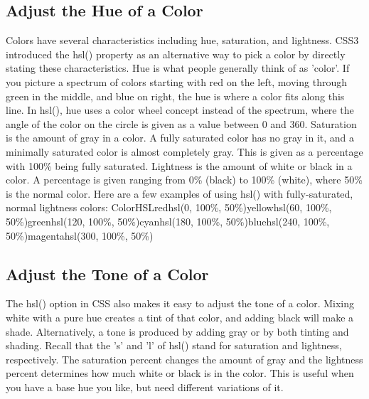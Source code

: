 \documentclass{article}%
\begin{document}
%
\subsection{Adjust the Hue of a Color}%
\label{subsec:AdjusttheHueofaColor}%
Colors have several characteristics including hue, saturation, and lightness. CSS3 introduced the hsl() property as an alternative way to pick a color by directly stating these characteristics.\newline%
Hue is what people generally think of as 'color'. If you picture a spectrum of colors starting with red on the left, moving through green in the middle, and blue on right, the hue is where a color fits along this line. In hsl(), hue uses a color wheel concept instead of the spectrum, where the angle of the color on the circle is given as a value between 0 and 360.\newline%
Saturation is the amount of gray in a color. A fully saturated color has no gray in it, and a minimally saturated color is almost completely gray. This is given as a percentage with 100\% being fully saturated.\newline%
Lightness is the amount of white or black in a color. A percentage is given ranging from 0\% (black) to 100\% (white), where 50\% is the normal color.\newline%
Here are a few examples of using hsl() with fully{-}saturated, normal lightness colors:\newline%
ColorHSLredhsl(0, 100\%, 50\%)yellowhsl(60, 100\%, 50\%)greenhsl(120, 100\%, 50\%)cyanhsl(180, 100\%, 50\%)bluehsl(240, 100\%, 50\%)magentahsl(300, 100\%, 50\%)\newline%

%
\subsection{Adjust the Tone of a Color}%
\label{subsec:AdjusttheToneofaColor}%
The hsl() option in CSS also makes it easy to adjust the tone of a color. Mixing white with a pure hue creates a tint of that color, and adding black will make a shade. Alternatively, a tone is produced by adding gray or by both tinting and shading. Recall that the 's' and 'l' of hsl() stand for saturation and lightness, respectively. The saturation percent changes the amount of gray and the lightness percent determines how much white or black is in the color. This is useful when you have a base hue you like, but need different variations of it.\newline%
\end{document}
